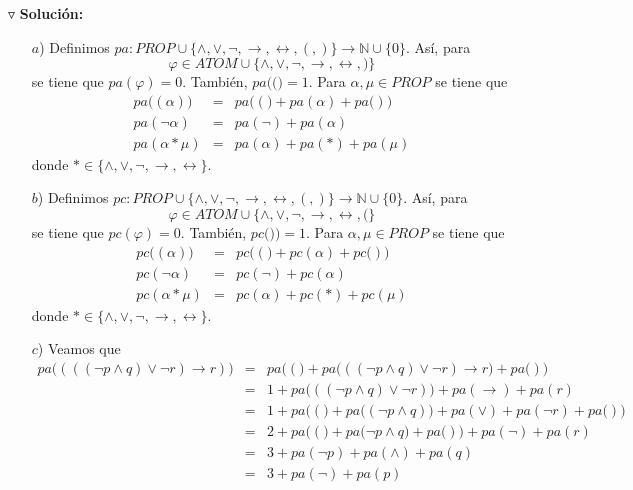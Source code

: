 \documentclass{article}
\begin{document}
$\triangledown$ \textbf{Solución:}
\begin{itemize}
  \item[$a$)] Definimos $pa: PROP \cup \{\land, \lor, \neg, \rightarrow, \leftrightarrow, (, )\} \rightarrow \mathbb{N} \cup \{0\}$.
  Así, para
  \[
  \varphi \in ATOM \cup \{\land, \lor, \neg, \rightarrow, \leftrightarrow, )\}
  \]
  se tiene que $pa(\varphi) = 0$. También, $pa\big((\big) = 1$. Para $\alpha, \mu \in PROP$ se tiene que
  \begin{eqnarray*}
    pa\big((\alpha)\big) &=& pa\big((\big) + pa(\alpha) + pa\big()\big)\\
    pa(\neg \alpha) &=& pa(\neg) + pa(\alpha)\\
    pa(\alpha * \mu) &=& pa(\alpha) + pa(*) + pa(\mu)
  \end{eqnarray*}
  donde $* \in \{\land, \lor, \neg, \rightarrow, \leftrightarrow\}$.
\item[$b$)] Definimos $pc: PROP \cup \{\land, \lor, \neg, \rightarrow, \leftrightarrow, (, )\} \rightarrow \mathbb{N} \cup \{0\}$.
  Así, para
  \[
  \varphi \in ATOM \cup \{\land, \lor, \neg, \rightarrow, \leftrightarrow, (\}
  \]
  se tiene que $pc(\varphi) = 0$. También, $pc\big()\big) = 1$. Para $\alpha, \mu \in PROP$ se tiene que
  \begin{eqnarray*}
    pc\big((\alpha)\big) &=& pc\big((\big) + pc(\alpha) + pc\big()\big)\\
    pc(\neg \alpha) &=& pc(\neg) + pc(\alpha)\\
    pc(\alpha * \mu) &=& pc(\alpha) + pc(*) + pc(\mu)    
  \end{eqnarray*}
  donde $* \in \{\land, \lor, \neg, \rightarrow, \leftrightarrow\}$.
\item[$c$)] Veamos que
  \begin{eqnarray*}
    pa\big((((\neg p \land q) \lor \neg r) \rightarrow r)\big)  &=&
    pa\big((\big) + pa\big(((\neg p \land q) \lor \neg r) \rightarrow r\big) + pa\big()\big)\\
    &=& 1 + pa\big(((\neg p \land q)\lor \neg r)\big) + pa(\rightarrow) + pa(r)\\
    &=& 1 + pa\big((\big) + pa\big((\neg p \land q)\big) + pa(\lor) + pa(\neg r) + pa\big()\big)\\
    &=& 2 + pa\big((\big) + pa\big(\neg p \land q\big) + pa\big()\big) + pa(\neg) + pa(r)\\
    &=& 3 + pa(\neg p) + pa(\land) + pa(q)\\
    &=& 3 + pa(\neg) + pa(p)\\

\end{eqnarray*}
\end{itemize}
\end{document}
